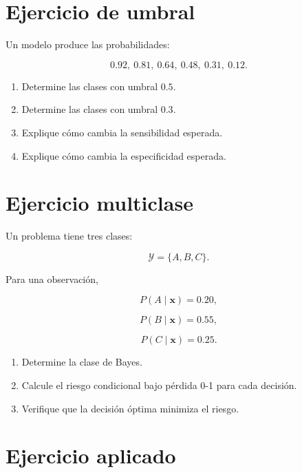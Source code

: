 \documentclass[
  spanish,
  10.5pt,
  letterpaper,
  DIV=11,
  numbers=noendperiod,
  oneside,
  open=any]{scrreprt}
\providecommand{\tightlist}{%
  \setlength{\itemsep}{0pt}\setlength{\parskip}{0pt}}
\theoremstyle{definition}
\theoremstyle{definition}
\theoremstyle{plain}
\theoremstyle{remark}
\begin{document}
\section*{Ejercicio de umbral}\label{ejercicio-de-umbral}


Un modelo produce las probabilidades:

\[
0.92,\ 0.81,\ 0.64,\ 0.48,\ 0.31,\ 0.12.
\]

\begin{enumerate}
\def\labelenumi{\arabic{enumi}.}
\tightlist
\item
  Determine las clases con umbral \(0.5\).
\item
  Determine las clases con umbral \(0.3\).
\item
  Explique cómo cambia la sensibilidad esperada.
\item
  Explique cómo cambia la especificidad esperada.
\end{enumerate}

\section*{Ejercicio multiclase}\label{ejercicio-multiclase}


Un problema tiene tres clases:

\[
\mathcal{Y}
=
\{A,B,C\}.
\]

Para una observación,

\[
P(A\mid\mathbf{x})=0.20,
\]

\[
P(B\mid\mathbf{x})=0.55,
\]

\[
P(C\mid\mathbf{x})=0.25.
\]

\begin{enumerate}
\def\labelenumi{\arabic{enumi}.}
\tightlist
\item
  Determine la clase de Bayes.
\item
  Calcule el riesgo condicional bajo pérdida 0-1 para cada decisión.
\item
  Verifique que la decisión óptima minimiza el riesgo.
\end{enumerate}

\section*{Ejercicio aplicado}\label{ejercicio-aplicado-3}
\end{document}
